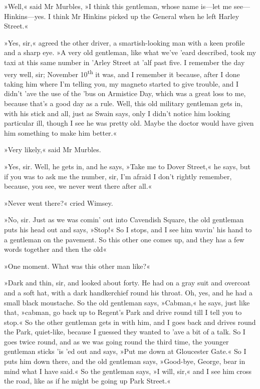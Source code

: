 »Well,« said Mr Murbles, »I think this gentleman, whose name is—let me see—Hinkins—yes. I think Mr Hinkins picked up the General when he left Harley Street.«

»Yes, sir,« agreed the other driver, a smartish-looking man with a keen profile and a sharp eye. »A very old gentleman, like what we've 'eard described, took my taxi at this same number in 'Arley Street at 'alf past five. I remember the day very well, sir; November  10\textsuperscript{th} it was, and I remember it because, after I done taking him where I'm telling you, my magneto started to give trouble, and I didn't 'ave the use of the 'bus on Armistice Day, which was a great loss to me, because that's a good day as a rule. Well, this old military gentleman gets in, with his stick and all, just as Swain says, only I didn't notice him looking particular ill, though I see he was pretty old. Maybe the doctor would have given him something to make him better.«

»Very likely,« said Mr Murbles.

»Yes, sir. Well, he gets in, and he says, »Take me to Dover Street,« he says, but if you was to ask me the number, sir, I'm afraid I don't rightly remember, because, you see, we never went there after all.«

»Never went there?« cried Wimsey.

»No, sir. Just as we was comin' out into Cavendish Square, the old gentleman puts his head out and says, »Stop!« So I stops, and I see him wavin' his hand to a gentleman on the pavement. So this other one comes up, and they has a few words together and then the old\longdash«

»One moment. What was this other man like?«

»Dark and thin, sir, and looked about forty. He had on a gray suit and overcoat and a soft hat, with a dark handkerchief round his throat. Oh, yes, and he had a small black moustache. So the old gentleman says, »Cabman,« he says, just like that, »cabman, go back up to Regent's Park and drive round till I tell you to stop.« So the other gentleman gets in with him, and I goes back and drives round the Park, quiet-like, because I guessed they wanted to 'ave a bit of a talk. So I goes twice round, and as we was going round the third time, the younger gentleman sticks 'is 'ed out and says, »Put me down at Gloucester Gate.« So I puts him down there, and the old gentleman says, »Good-bye, George, bear in mind what I have said.« So the gentleman says, »I will, sir,« and I see him cross the road, like as if he might be going up Park Street.«

